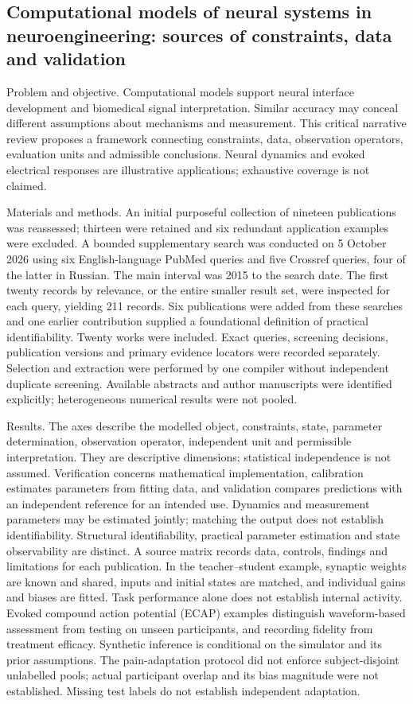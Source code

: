 \documentclass[12pt,a4paper]{article}
\begin{document}
\subsection*{Computational models of neural systems in neuroengineering: sources of constraints, data and validation}
Problem and objective. Computational models support neural interface development and biomedical signal interpretation. Similar accuracy may conceal different assumptions about mechanisms and measurement. This critical narrative review proposes a framework connecting constraints, data, observation operators, evaluation units and admissible conclusions. Neural dynamics and evoked electrical responses are illustrative applications; exhaustive coverage is not claimed.\par
Materials and methods. An initial purposeful collection of nineteen publications was reassessed; thirteen were retained and six redundant application examples were excluded. A bounded supplementary search was conducted on 5 October 2026 using six English-language PubMed queries and five Crossref queries, four of the latter in Russian. The main interval was 2015 to the search date. The first twenty records by relevance, or the entire smaller result set, were inspected for each query, yielding 211 records. Six publications were added from these searches and one earlier contribution supplied a foundational definition of practical identifiability. Twenty works were included. Exact queries, screening decisions, publication versions and primary evidence locators were recorded separately. Selection and extraction were performed by one compiler without independent duplicate screening. Available abstracts and author manuscripts were identified explicitly; heterogeneous numerical results were not pooled.\par
Results. The axes describe the modelled object, constraints, state, parameter determination, observation operator, independent unit and permissible interpretation. They are descriptive dimensions; statistical independence is not assumed. Verification concerns mathematical implementation, calibration estimates parameters from fitting data, and validation compares predictions with an independent reference for an intended use. Dynamics and measurement parameters may be estimated jointly; matching the output does not establish identifiability. Structural identifiability, practical parameter estimation and state observability are distinct. A source matrix records data, controls, findings and limitations for each publication. In the teacher–student example, synaptic weights are known and shared, inputs and initial states are matched, and individual gains and biases are fitted. Task performance alone does not establish internal activity. Evoked compound action potential (ECAP) examples distinguish waveform-based assessment from testing on unseen participants, and recording fidelity from treatment efficacy. Synthetic inference is conditional on the simulator and its prior assumptions. The pain-adaptation protocol did not enforce subject-disjoint unlabelled pools; actual participant overlap and its bias magnitude were not established. Missing test labels do not establish independent adaptation.\par
\end{document}
